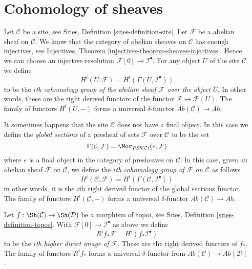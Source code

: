 \section{Cohomology of sheaves}
\label{section-cohomology-sheaves}

\noindent
Let $\mathcal{C}$ be a site, see
Sites, Definition \ref{sites-definition-site}.
Let $\mathcal{F}$ be a abelian sheaf on $\mathcal{C}$.
We know that the category of abelian sheaves on $\mathcal{C}$
has enough injectives, see
Injectives, Theorem \ref{injectives-theorem-sheaves-injectives}.
Hence we can choose an injective resolution
$\mathcal{F}[0] \to \mathcal{I}^\bullet$.
For any object $U$ of the site $\mathcal{C}$ we define
\begin{equation}
\label{equation-cohomology-object-site}
H^i(U, \mathcal{F}) = H^i(\Gamma(U, \mathcal{I}^\bullet))
\end{equation}
to be the {\it $i$th cohomology group of the abelian sheaf
$\mathcal{F}$ over the object $U$}. In other words, these are the
right derived functors of the functor $\mathcal{F} \mapsto \mathcal{F}(U)$.
The family of functors $H^i(U, -)$ forms a universal $\delta$-functor
$\textit{Ab}(\mathcal{C}) \to \textit{Ab}$.

\medskip\noindent
It sometimes happens that
the site $\mathcal{C}$ does not have a final object. In this
case we define the {\it global sections} of a presheaf
of sets $\mathcal{F}$ over $\mathcal{C}$ to be the set
\begin{equation}
\label{equation-global-sections}
\Gamma(\mathcal{C}, \mathcal{F}) =
\Mor_{\textit{PSh}(\mathcal{C})}(e, \mathcal{F})
\end{equation}
where $e$ is a final object in the category of presheaves on $\mathcal{C}$.
In this case, given an abelian sheaf $\mathcal{F}$ on $\mathcal{C}$,
we define the {\it $i$th cohomology group of $\mathcal{F}$ on $\mathcal{C}$}
as follows
\begin{equation}
\label{equation-cohomology}
H^i(\mathcal{C}, \mathcal{F}) = H^i(\Gamma(\mathcal{C}, \mathcal{I}^\bullet))
\end{equation}
in other words, it is the $i$th right derived functor of the
global sections functor.
The family of functors $H^i(\mathcal{C}, -)$ forms a universal $\delta$-functor
$\textit{Ab}(\mathcal{C}) \to \textit{Ab}$.

\medskip\noindent
Let $f : \Sh(\mathcal{C}) \to \Sh(\mathcal{D})$ be a morphism of topoi, see
Sites, Definition \ref{sites-definition-topos}.
With $\mathcal{F}[0] \to \mathcal{I}^\bullet$ as above
we define
\begin{equation}
\label{equation-higher-direct-image}
R^if_*\mathcal{F} = H^i(f_*\mathcal{I}^\bullet)
\end{equation}
to be the {\it $i$th higher direct image of $\mathcal{F}$}.
These are the right derived functors of $f_*$.
The family of functors $R^if_*$ forms a universal $\delta$-functor
from $\textit{Ab}(\mathcal{C}) \to \textit{Ab}(\mathcal{D})$.

